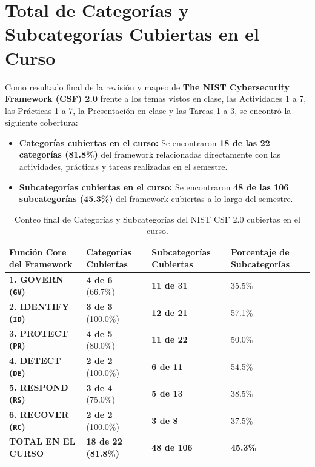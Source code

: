 \documentclass[letterpaper,11pt]{article}
\begin{document}
\section{Total de Categorías y Subcategorías Cubiertas en el Curso}

Como resultado final de la revisión y mapeo de \textbf{The NIST Cybersecurity Framework (CSF) 2.0} frente a los temas vistos en clase, las Actividades 1 a 7, las Prácticas 1 a 7, la Presentación en clase y las Tareas 1 a 3, se encontró la siguiente cobertura:

\begin{itemize}[leftmargin=1.2cm, itemsep=3pt]
    \item \textbf{Categorías cubiertas en el curso:} Se encontraron \textbf{18 de las 22 categorías (81.8\%)} del framework relacionadas directamente con las actividades, prácticas y tareas realizadas en el semestre.
    \item \textbf{Subcategorías cubiertas en el curso:} Se encontraron \textbf{48 de las 106 subcategorías (45.3\%)} del framework cubiertas a lo largo del semestre.
\end{itemize}

\begin{table}[H]
\centering
\footnotesize
\setlength{\tabcolsep}{6pt}
\renewcommand{\arraystretch}{1.28}
\caption{Conteo final de Categorías y Subcategorías del NIST CSF 2.0 cubiertas en el curso.}
\label{tab:conteo-final}
\begin{tabular}{|L{4.2cm}|C{3.4cm}|C{3.4cm}|C{3.6cm}|}
\hline
{}
\textbf{Función Core del Framework} & \textbf{Categorías Cubiertas} & \textbf{Subcategorías Cubiertas} & \textbf{Porcentaje de Subcategorías} \\
\hline
{}
\textbf{1. GOVERN (\texttt{GV})} & \textbf{4 de 6} (66.7\%) & \textbf{11 de 31} & 35.5\% \\
\hline
{}
\textbf{2. IDENTIFY (\texttt{ID})} & \textbf{3 de 3} (100.0\%) & \textbf{12 de 21} & 57.1\% \\
\hline
{}
\textbf{3. PROTECT (\texttt{PR})} & \textbf{4 de 5} (80.0\%) & \textbf{11 de 22} & 50.0\% \\
\hline
{}
\textbf{4. DETECT (\texttt{DE})} & \textbf{2 de 2} (100.0\%) & \textbf{6 de 11} & 54.5\% \\
\hline
{}
\textbf{5. RESPOND (\texttt{RS})} & \textbf{3 de 4} (75.0\%) & \textbf{5 de 13} & 38.5\% \\
\hline
{}
\textbf{6. RECOVER (\texttt{RC})} & \textbf{2 de 2} (100.0\%) & \textbf{3 de 8} & 37.5\% \\
\hline
{}
\textbf{TOTAL EN EL CURSO} & \textbf{18 de 22 (81.8\%)} & \textbf{48 de 106} & \textbf{45.3\%} \\
\hline
\end{tabular}
\end{table}

\newpage
\printbibliography[title={Referencias Bibliográficas}]
\end{document}
